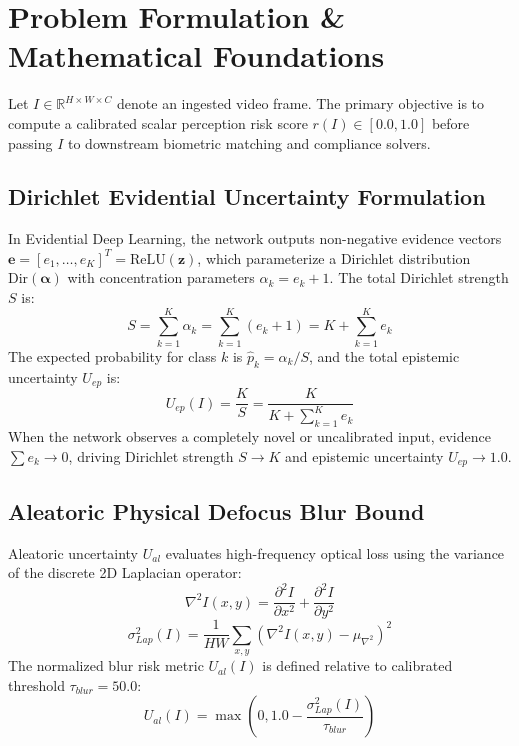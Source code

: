 \documentclass[conference]{IEEEtran}
\begin{document}
\section{Problem Formulation & Mathematical Foundations}
Let $I \in \mathbb{R}^{H \times W \times C}$ denote an ingested video frame. The primary objective is to compute a calibrated scalar perception risk score $r(I) \in [0.0, 1.0]$ before passing $I$ to downstream biometric matching and compliance solvers.

\subsection{Dirichlet Evidential Uncertainty Formulation}
In Evidential Deep Learning, the network outputs non-negative evidence vectors $\mathbf{e} = [e_1, \dots, e_K]^T = \text{ReLU}(\mathbf{z})$, which parameterize a Dirichlet distribution $\text{Dir}(\boldsymbol{\alpha})$ with concentration parameters $\alpha_k = e_k + 1$. The total Dirichlet strength $S$ is:
\begin{equation}
S = \sum_{k=1}^K \alpha_k = \sum_{k=1}^K (e_k + 1) = K + \sum_{k=1}^K e_k
\end{equation}
The expected probability for class $k$ is $\hat{p}_k = \alpha_k / S$, and the total epistemic uncertainty $U_{ep}$ is:
\begin{equation}
U_{ep}(I) = \frac{K}{S} = \frac{K}{K + \sum_{k=1}^K e_k}
\end{equation}
When the network observes a completely novel or uncalibrated input, evidence $\sum e_k \to 0$, driving Dirichlet strength $S \to K$ and epistemic uncertainty $U_{ep} \to 1.0$.

\subsection{Aleatoric Physical Defocus Blur Bound}
Aleatoric uncertainty $U_{al}$ evaluates high-frequency optical loss using the variance of the discrete 2D Laplacian operator:
\begin{equation}
\nabla^2 I(x,y) = \frac{\partial^2 I}{\partial x^2} + \frac{\partial^2 I}{\partial y^2}
\end{equation}
\begin{equation}
\sigma_{Lap}^2(I) = \frac{1}{HW} \sum_{x,y} \left( \nabla^2 I(x,y) - \mu_{\nabla^2} \right)^2
\end{equation}
The normalized blur risk metric $U_{al}(I)$ is defined relative to calibrated threshold $\tau_{blur} = 50.0$:
\begin{equation}
U_{al}(I) = \max\left(0, 1.0 - \frac{\sigma_{Lap}^2(I)}{\tau_{blur}}\right)
\end{equation}
\end{document}
